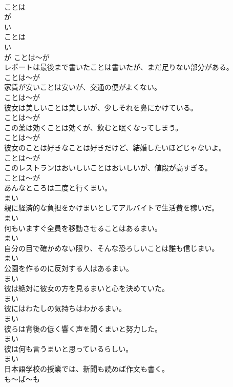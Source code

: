\documentclass[8pt]{extreport}
\begin{document}
\begin{CJK}{UTF8}{min}
\\	ことは 
\\	が	
\\	い
\\	ことは 
\\	い
\\	が	ことは～が	
\\	レポートは最後まで書いたことは書いたが、まだ足りない部分がある。	
\\	ことは～が	
\\	家賃が安いことは安いが、交通の便がよくない。	
\\	ことは～が	
\\	彼女は美しいことは美しいが、少しそれを鼻にかけている。	
\\	ことは～が	
\\	この薬は効くことは効くが、飲むと眠くなってしまう。	
\\	ことは～が	
\\	彼女のことは好きなことは好きだけど、結婚したいほどじゃないよ。	
\\	ことは～が	
\\	このレストランはおいしいことはおいしいが、値段が高すぎる。	
\\	ことは～が	
\\	あんなところは二度と行くまい。	
\\	まい	
\\	親に経済的な負担をかけまいとしてアルバイトで生活費を稼いだ。	
\\	まい	
\\	何もいますぐ全員を移動させることはあるまい。	
\\	まい	
\\	自分の目で確かめない限り、そんな恐ろしいことは誰も信じまい。	
\\	まい	
\\	公園を作るのに反対する人はあるまい。	
\\	まい	
\\	彼は絶対に彼女の方を見るまいと心を決めていた。	
\\	まい	
\\	彼にはわたしの気持ちはわかるまい。	
\\	まい	
\\	彼らは背後の低く響く声を聞くまいと努力した。	
\\	まい	
\\	彼は何も言うまいと思っているらしい。	
\\	まい	
\\	日本語学校の授業では、新聞も読めば作文も書く。	
\\	も～ば～も	

\end{CJK}
\end{document}
